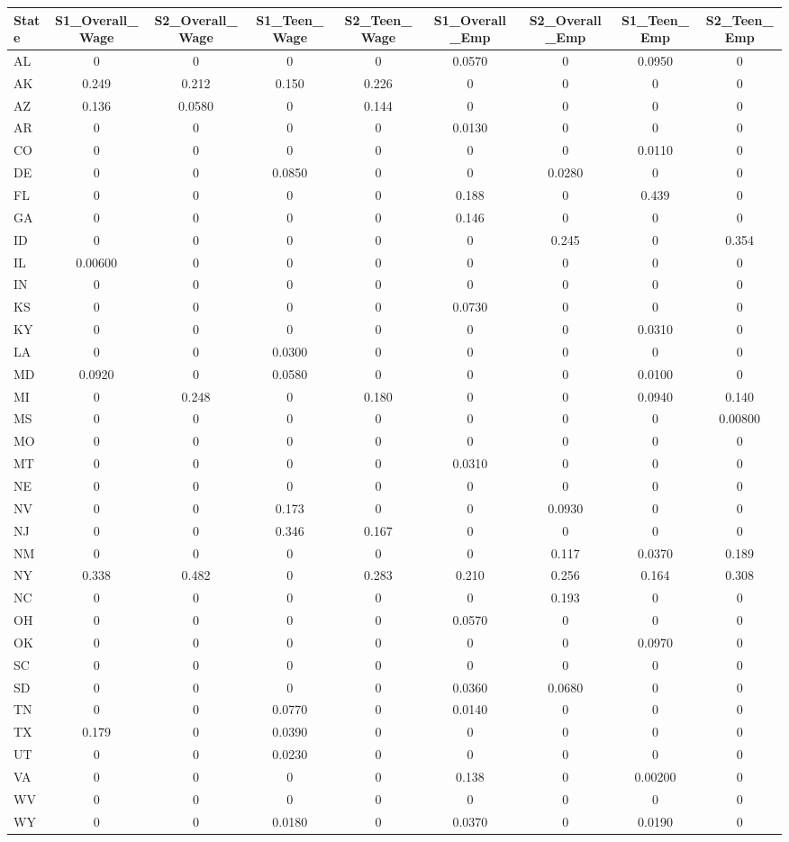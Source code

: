 \documentclass[]{article}
\begin{document}
\begin{tabular}{lcccccccc} \hline
State & S1\_Overall\_Wage & S2\_Overall\_Wage & S1\_Teen\_Wage & S2\_Teen\_Wage & S1\_Overall\_Emp & S2\_Overall\_Emp & S1\_Teen\_Emp & S2\_Teen\_Emp \\ \hline
AL & 0 & 0 & 0 & 0 & 0.0570 & 0 & 0.0950 & 0 \\
AK & 0.249 & 0.212 & 0.150 & 0.226 & 0 & 0 & 0 & 0 \\
AZ & 0.136 & 0.0580 & 0 & 0.144 & 0 & 0 & 0 & 0 \\
AR & 0 & 0 & 0 & 0 & 0.0130 & 0 & 0 & 0 \\
CO & 0 & 0 & 0 & 0 & 0 & 0 & 0.0110 & 0 \\
DE & 0 & 0 & 0.0850 & 0 & 0 & 0.0280 & 0 & 0 \\
FL & 0 & 0 & 0 & 0 & 0.188 & 0 & 0.439 & 0 \\
GA & 0 & 0 & 0 & 0 & 0.146 & 0 & 0 & 0 \\
ID & 0 & 0 & 0 & 0 & 0 & 0.245 & 0 & 0.354 \\
IL & 0.00600 & 0 & 0 & 0 & 0 & 0 & 0 & 0 \\
IN & 0 & 0 & 0 & 0 & 0 & 0 & 0 & 0 \\
KS & 0 & 0 & 0 & 0 & 0.0730 & 0 & 0 & 0 \\
KY & 0 & 0 & 0 & 0 & 0 & 0 & 0.0310 & 0 \\
LA & 0 & 0 & 0.0300 & 0 & 0 & 0 & 0 & 0 \\
MD & 0.0920 & 0 & 0.0580 & 0 & 0 & 0 & 0.0100 & 0 \\
MI & 0 & 0.248 & 0 & 0.180 & 0 & 0 & 0.0940 & 0.140 \\
MS & 0 & 0 & 0 & 0 & 0 & 0 & 0 & 0.00800 \\
MO & 0 & 0 & 0 & 0 & 0 & 0 & 0 & 0 \\
MT & 0 & 0 & 0 & 0 & 0.0310 & 0 & 0 & 0 \\
NE & 0 & 0 & 0 & 0 & 0 & 0 & 0 & 0 \\
NV & 0 & 0 & 0.173 & 0 & 0 & 0.0930 & 0 & 0 \\
NJ & 0 & 0 & 0.346 & 0.167 & 0 & 0 & 0 & 0 \\
NM & 0 & 0 & 0 & 0 & 0 & 0.117 & 0.0370 & 0.189 \\
NY & 0.338 & 0.482 & 0 & 0.283 & 0.210 & 0.256 & 0.164 & 0.308 \\
NC & 0 & 0 & 0 & 0 & 0 & 0.193 & 0 & 0 \\
OH & 0 & 0 & 0 & 0 & 0.0570 & 0 & 0 & 0 \\
OK & 0 & 0 & 0 & 0 & 0 & 0 & 0.0970 & 0 \\
SC & 0 & 0 & 0 & 0 & 0 & 0 & 0 & 0 \\
SD & 0 & 0 & 0 & 0 & 0.0360 & 0.0680 & 0 & 0 \\
TN & 0 & 0 & 0.0770 & 0 & 0.0140 & 0 & 0 & 0 \\
TX & 0.179 & 0 & 0.0390 & 0 & 0 & 0 & 0 & 0 \\
UT & 0 & 0 & 0.0230 & 0 & 0 & 0 & 0 & 0 \\
VA & 0 & 0 & 0 & 0 & 0.138 & 0 & 0.00200 & 0 \\
WV & 0 & 0 & 0 & 0 & 0 & 0 & 0 & 0 \\
 WY & 0 & 0 & 0.0180 & 0 & 0.0370 & 0 & 0.0190 & 0 \\ \hline
\end{tabular}
\end{document}
